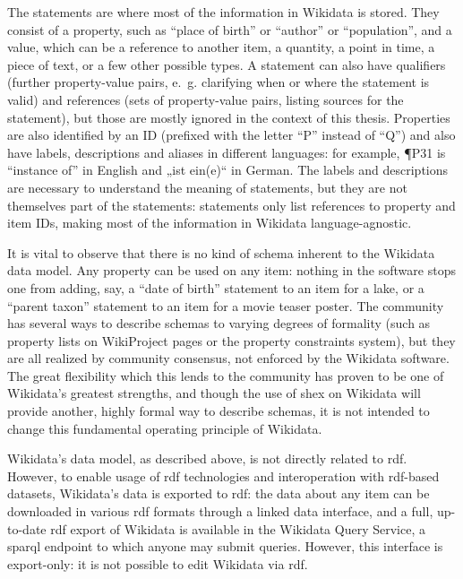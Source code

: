 The statements are where most of the information in Wikidata is stored.
They consist of a property, such as “place of birth” or “author” or “population”,
and a value, which can be a reference to another item, a quantity, a point in time, a piece of text,
or a few other possible types.
A statement can also have qualifiers
(further property-value pairs, e.~g. clarifying when or where the statement is valid)
and references (sets of property-value pairs, listing sources for the statement),
but those are mostly ignored in the context of this thesis.
Properties are also identified by an ID
(prefixed with the letter “P” instead of “Q”)
and also have labels, descriptions and aliases in different languages:
for example, \P{P31} is “instance of” in English and „\foreignlanguage{ngerman}{ist ein(e)}“ in German.
The labels and descriptions are necessary to understand the meaning of statements,
but they are not themselves part of the statements:
statements only list references to property and item IDs,
making most of the information in Wikidata language-agnostic.

It is vital to observe that there is no kind of schema inherent to the Wikidata data model.
Any property can be used on any item:
nothing in the software stops one from adding, say,
a “date of birth” statement to an item for a lake,
or a “parent taxon” statement to an item for a movie teaser poster.
The community has several ways to describe schemas to varying degrees of formality
(such as property lists on WikiProject pages or the property constraints system),
but they are all realized by community consensus,
not enforced by the Wikidata software.
The great flexibility which this lends to the community has proven to be one of Wikidata’s greatest strengths, %
and though the use of \gls{shex}
on Wikidata will provide another,
highly formal way to describe schemas,
it is not intended to change this fundamental operating principle of Wikidata. %

Wikidata’s data model, as described above,
is not directly related to \gls{rdf}.
However, to enable usage of \gls{rdf} technologies and interoperation with \gls{rdf}-based datasets,
Wikidata’s data is exported to \gls{rdf}:
the data about any item can be downloaded in various \gls{rdf} formats through a linked data interface, %
and a full, up-to-date \gls{rdf} export of Wikidata is available in the Wikidata Query Service,
a \acrshort{sparql} endpoint to which anyone may submit queries.
However, this interface is export-only:
it is not possible to edit Wikidata via \gls{rdf}.

